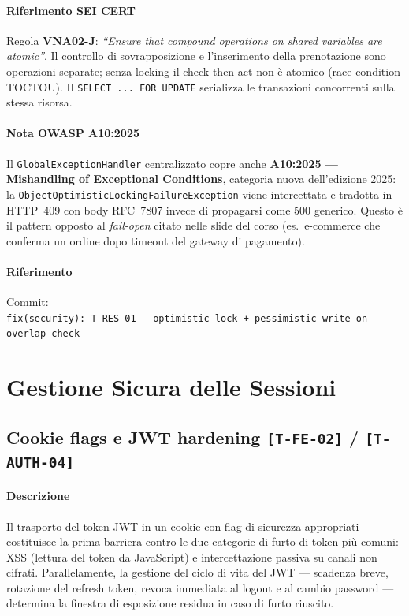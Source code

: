 ﻿\documentclass[a4paper,12pt]{report}
\newcommand{\commitref}[2]{\texttt{\small \href{https://github.com/diegoandruccioli/hotel-pms/commit/#1}{#2}}}
\newcommand{\threat}[1]{\texttt{\small\textcolor{vulnred}{[#1]}}}
\begin{document}
\paragraph{Riferimento SEI CERT} Regola \textbf{VNA02-J}: \emph{``Ensure that compound operations on shared variables are atomic''}. Il controllo di sovrapposizione e l'inserimento della prenotazione sono operazioni separate; senza locking il check-then-act non è atomico (race condition TOCTOU). Il \texttt{SELECT ... FOR UPDATE} serializza le transazioni concorrenti sulla stessa risorsa.

\paragraph{Nota OWASP A10:2025} Il \texttt{GlobalExceptionHandler} centralizzato copre anche \textbf{A10:2025 --- Mishandling of Exceptional Conditions}, categoria nuova dell'edizione 2025: la \texttt{ObjectOptimisticLockingFailureException} viene intercettata e tradotta in HTTP~409 con body RFC~7807 invece di propagarsi come 500 generico. Questo è il pattern opposto al \emph{fail-open} citato nelle slide del corso (es.\ e-commerce che conferma un ordine dopo timeout del gateway di pagamento).

\paragraph{Riferimento} Commit:\\
\commitref{ca9bf92}{fix(security): T-RES-01 --- optimistic lock + pessimistic write on overlap check}

\section{Gestione Sicura delle Sessioni}

\subsection{Cookie flags e JWT hardening \threat{T-FE-02} / \threat{T-AUTH-04}}

\paragraph{Descrizione}
Il trasporto del token JWT in un cookie con flag di sicurezza appropriati
costituisce la prima barriera contro le due categorie di furto di token più
comuni: XSS (lettura del token da JavaScript) e intercettazione passiva su canali
non cifrati.
Parallelamente, la gestione del ciclo di vita del JWT — scadenza breve,
rotazione del refresh token, revoca immediata al logout e al cambio password —
determina la finestra di esposizione residua in caso di furto riuscito.
\end{document}

